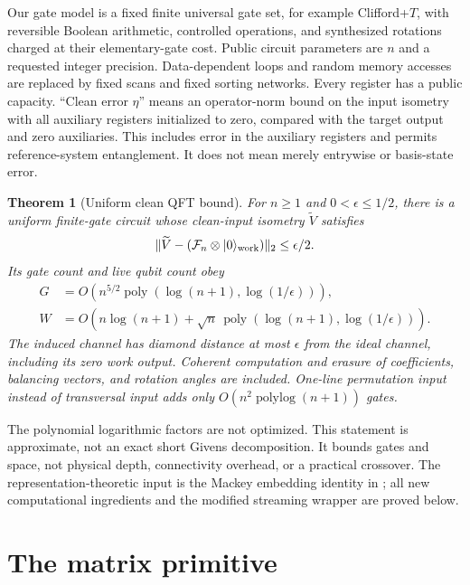 \documentclass[11pt]{article}
\newtheorem{theorem}{Theorem}
\theoremstyle{definition}
\newcommand{\ket}[1]{\lvert #1\rangle}
\newcommand{\norm}[1]{\lVert #1\rVert}
\newcommand{\poly}{\operatorname{poly}}
\newcommand{\polylog}{\operatorname{polylog}}
\newcommand{\F}{\mathcal F}
\begin{document}
Our gate model is a fixed finite universal gate set, for example Clifford+$T$,
with reversible Boolean arithmetic, controlled operations, and synthesized
rotations charged at their elementary-gate cost. Public circuit parameters
are $n$ and a requested integer precision. Data-dependent loops and random
memory accesses are replaced by fixed scans and fixed sorting networks.
Every register has a public capacity. ``Clean error $\eta$'' means an
operator-norm bound on the input isometry with all auxiliary registers
initialized to zero, compared with the target output and zero auxiliaries.
This includes error in the auxiliary registers and permits reference-system
entanglement. It does not mean merely entrywise or basis-state error.

\begin{theorem}[Uniform clean QFT bound]\label{thm:main}
For $n\ge1$ and $0<\epsilon\le1/2$, there is a uniform finite-gate circuit
whose clean-input isometry $\widetilde V$ satisfies
\[
 \norm{\widetilde V-(\F_n\otimes\ket{0}_{\rm work})}_2
 \le\epsilon/2.
\]
Its gate count and live qubit count obey
\begin{align*}
 G&=O\!\left(n^{5/2}\poly(\log(n+1),\log(1/\epsilon))\right),\\
 W&=O\!\left(n\log(n+1)+\sqrt n\,
                  \poly(\log(n+1),\log(1/\epsilon))\right).
\end{align*}
The induced channel has diamond distance at most $\epsilon$ from the ideal
channel, including its zero work output. Coherent computation and erasure
of coefficients, balancing vectors, and rotation angles are included.
One-line permutation input instead of transversal input adds only
$O(n^2\polylog(n+1))$ gates.
\end{theorem}

The polynomial logarithmic factors are not optimized. This statement is
approximate, not an exact short Givens decomposition. It bounds gates and
space, not physical depth, connectivity overhead, or a practical crossover.
The representation-theoretic input is the Mackey embedding identity in
\cite[Definitions 5.16--5.18, Theorem 5.17]{BGO}; all new computational
ingredients and the modified streaming wrapper are proved below.

\section{The matrix primitive}
\end{document}
